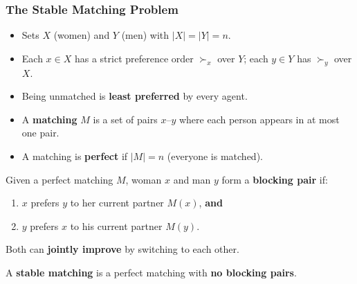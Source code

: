 \bigseparator

\subsubsection{The Stable Matching Problem}

\begin{defbox}
\begin{itemize}
  \item Sets $X$ (women) and $Y$ (men) with $|X| = |Y| = n$.
  \item Each $x \in X$ has a strict preference order $\succ_x$ over $Y$; each $y \in Y$ has $\succ_y$ over $X$.
  \item Being unmatched is \textbf{least preferred} by every agent.
  \item A \textbf{matching} $M$ is a set of pairs $x$--$y$ where each person appears in at most one pair.
  \item A matching is \textbf{perfect} if $|M| = n$ (everyone is matched).
\end{itemize}
\end{defbox}

\begin{defbox}
Given a perfect matching $M$, woman $x$ and man $y$ form a \textbf{blocking pair} if:
\begin{enumerate}
  \item $x$ prefers $y$ to her current partner $M(x)$, \textbf{and}
  \item $y$ prefers $x$ to his current partner $M(y)$.
\end{enumerate}

Both can \textbf{jointly improve} by switching to each other.
\end{defbox}

\begin{defbox}
A \textbf{stable matching} is a perfect matching with \textbf{no blocking pairs}.
\end{defbox}

